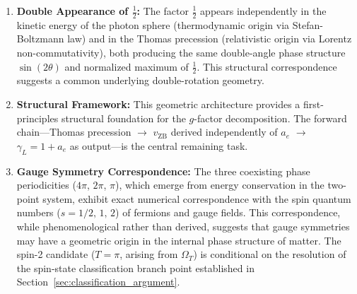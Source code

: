 \documentclass[%
 reprint,
 amsmath,amssymb,
 aps,
 prb,
]{revtex4-2}
\numberwithin{equation}{section}
\theoremstyle{definition}
\theoremstyle{remark}
\begin{document}
\begin{enumerate}
\item \textbf{Double Appearance of $\frac{1}{2}$:} The factor $\frac{1}{2}$ appears independently in the kinetic energy of the photon sphere (thermodynamic origin via Stefan-Boltzmann law) and in the Thomas precession (relativistic origin via Lorentz non-commutativity), both producing the same double-angle phase structure $\sin(2\theta)$ and normalized maximum of $\frac{1}{2}$. This structural correspondence suggests a common underlying double-rotation geometry.

\item \textbf{Structural Framework:} This geometric architecture provides a first-principles structural foundation for the $g$-factor decomposition. The forward chain---Thomas precession $\to$ $v_{\text{ZB}}$ derived independently of $a_e$ $\to$ $\gamma_L = 1+a_e$ as output---is the central remaining task.

\item \textbf{Gauge Symmetry Correspondence:} The three coexisting phase periodicities ($4\pi$, $2\pi$, $\pi$), which emerge from energy conservation in the two-point system, exhibit exact numerical correspondence with the spin quantum numbers ($s = 1/2,\, 1,\, 2$) of fermions and gauge fields. This correspondence, while phenomenological rather than derived, suggests that gauge symmetries may have a geometric origin in the internal phase structure of matter. The spin-2 candidate ($T = \pi$, arising from $\Omega_T$) is conditional on the resolution of the spin-state classification branch point established in Section~\ref{sec:classification_argument}.

\end{enumerate}
\end{document}

